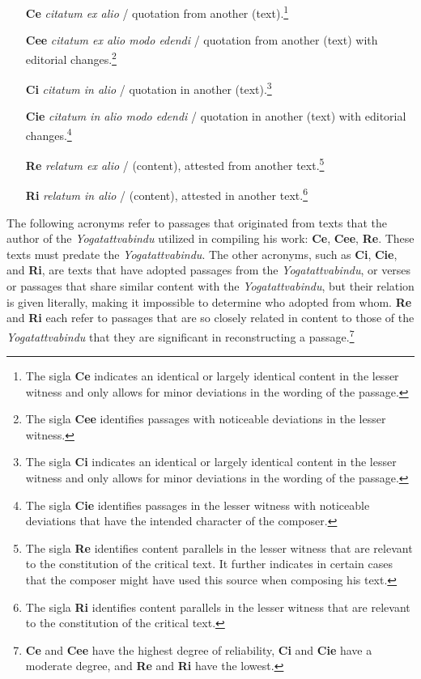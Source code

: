 \begin{enumerate}
\item[\textbf{Ce}] \textit{citatum ex alio} / quotation from another (text).\footnote{The sigla \textbf{Ce} indicates an identical or largely identical content in the lesser witness and only allows for minor deviations in the wording of the passage.}
\item[\textbf{Cee}] \textit{citatum ex alio modo edendi} / quotation from another (text) with editorial changes.\footnote{The sigla \textbf{Cee} identifies passages with noticeable deviations in the lesser witness.}
\item[\textbf{Ci}] \textit{citatum in alio} / quotation in another (text).\footnote{The sigla \textbf{Ci} indicates an identical or largely identical content in the lesser witness and only allows for minor deviations in the wording of the passage.}
\item[\textbf{Cie}] \textit{citatum in alio modo edendi} / quotation in another (text) with editorial changes.\footnote{The sigla \textbf{Cie} identifies passages in the lesser witness with noticeable deviations that have the intended character of the composer.}
\item[\textbf{Re}] \textit{relatum ex alio} / (content), attested from another text.\footnote{The sigla \textbf{Re} identifies content parallels in the lesser witness that are relevant to the constitution of the critical text. It further indicates in certain cases that the composer might have used this source when composing his text.}
\item[\textbf{Ri}] \textit{relatum in alio} / (content), attested in another text.\footnote{The sigla \textbf{Ri} identifies content parallels in the lesser witness that are relevant to the constitution of the critical text.}
\end{enumerate}

The following acronyms refer to passages that originated from texts that the author of the \textit{Yogatattvabindu} utilized in compiling his work: \textbf{Ce}, \textbf{Cee}, \textbf{Re}. These texts must predate the \textit{Yogatattvabindu}. The other acronyms, such as \textbf{Ci}, \textbf{Cie}, and \textbf{Ri}, are texts that have adopted passages from the \textit{Yogatattvabindu}, or verses or passages that share similar content with the \textit{Yogatattvabindu}, but their relation is given literally, making it impossible to determine who adopted from whom. \textbf{Re} and \textbf{Ri} each refer to passages that are so closely related in content to those of the \textit{Yogatattvabindu} that they are significant in reconstructing a passage.\footnote{\textbf{Ce} and \textbf{Cee} have the highest degree of reliability, \textbf{Ci} and \textbf{Cie} have a moderate degree, and \textbf{Re} and \textbf{Ri} have the lowest.}

